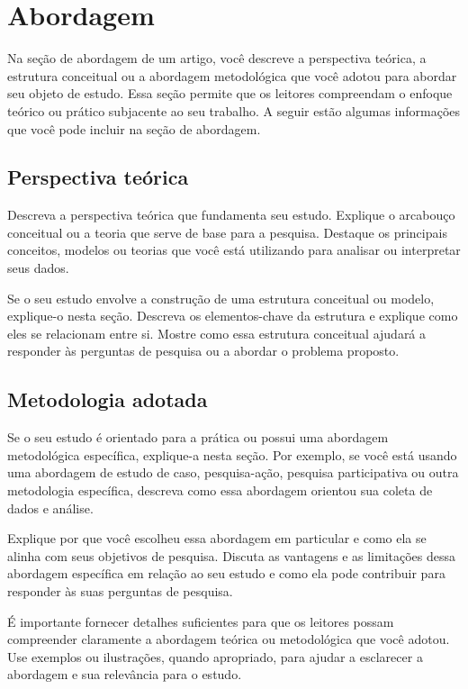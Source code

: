 \section{Abordagem}\label{:approach}

Na seção de abordagem de um artigo, você descreve a perspectiva teórica, a estrutura conceitual ou a abordagem metodológica que você adotou para abordar seu objeto de estudo. Essa seção permite que os leitores compreendam o enfoque teórico ou prático subjacente ao seu trabalho. A seguir estão algumas informações que você pode incluir na seção de abordagem.

\subsection{Perspectiva teórica}
Descreva a perspectiva teórica que fundamenta seu estudo. Explique o arcabouço conceitual ou a teoria que serve de base para a pesquisa. Destaque os principais conceitos, modelos ou teorias que você está utilizando para analisar ou interpretar seus dados.

Se o seu estudo envolve a construção de uma estrutura conceitual ou modelo, explique-o nesta seção. Descreva os elementos-chave da estrutura e explique como eles se relacionam entre si. Mostre como essa estrutura conceitual ajudará a responder às perguntas de pesquisa ou a abordar o problema proposto.

\subsection{Metodologia adotada} Se o seu estudo é orientado para a prática ou possui uma abordagem metodológica específica, explique-a nesta seção. Por exemplo, se você está usando uma abordagem de estudo de caso, pesquisa-ação, pesquisa participativa ou outra metodologia específica, descreva como essa abordagem orientou sua coleta de dados e análise.

Explique por que você escolheu essa abordagem em particular e como ela se alinha com seus objetivos de pesquisa. Discuta as vantagens e as limitações dessa abordagem específica em relação ao seu estudo e como ela pode contribuir para responder às suas perguntas de pesquisa.

É importante fornecer detalhes suficientes para que os leitores possam compreender claramente a abordagem teórica ou metodológica que você adotou. Use exemplos ou ilustrações, quando apropriado, para ajudar a esclarecer a abordagem e sua relevância para o estudo.

